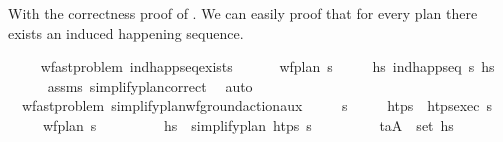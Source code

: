 \begin{isabellebody}
{\isafoldproof}%
%
\isadelimproof
%
\endisadelimproof
%
\begin{isamarkuptext}%
With the correctness proof of . 
  We can easily proof that for every plan there exists an induced happening sequence.%
\end{isamarkuptext}\isamarkuptrue%
\ \ \isamarkupfalse%
\ {\isacharparenleft}{\kern0pt}\ wf{\isacharunderscore}{\kern0pt}ast{\isacharunderscore}{\kern0pt}problem{\isacharparenright}{\kern0pt}\ ind{\isacharunderscore}{\kern0pt}happ{\isacharunderscore}{\kern0pt}seq{\isacharunderscore}{\kern0pt}exists{\isacharcolon}{\kern0pt}\ \isanewline
\ \ \ \ \ {\isachardoublequoteopen}wf{\isacharunderscore}{\kern0pt}plan\ {\isasympi}s{\isachardoublequoteclose}\isanewline
\ \ \ \ \ {\isachardoublequoteopen}{\isasymexists}hs{\isachardot}{\kern0pt}\ ind{\isacharunderscore}{\kern0pt}happ{\isacharunderscore}{\kern0pt}seq\ {\isasympi}s\ hs{\isachardoublequoteclose}\isanewline
%
\isadelimproof
\ \ \ \ %
\endisadelimproof
%
\isatagproof
{}\isamarkupfalse%
\ assms\ simplify{\isacharunderscore}{\kern0pt}plan{\isacharunderscore}{\kern0pt}correct\ \isamarkupfalse%
\ auto%
\endisatagproof
{\isafoldproof}%
%
\isadelimproof
\isanewline
%
\endisadelimproof
\isanewline
\ \ \isamarkupfalse%
\ {\isacharparenleft}{\kern0pt}\ wf{\isacharunderscore}{\kern0pt}ast{\isacharunderscore}{\kern0pt}problem{\isacharparenright}{\kern0pt}\ simplify{\isacharunderscore}{\kern0pt}plan{\isacharunderscore}{\kern0pt}wf{\isacharunderscore}{\kern0pt}ground{\isacharunderscore}{\kern0pt}action{\isacharunderscore}{\kern0pt}aux{\isacharcolon}{\kern0pt}\isanewline
\ \ \ \ \ {\isasympi}s\isanewline
\ \ \ \ \ {\isachardoublequoteopen}htps\ {\isasymequiv}\ htps{\isacharunderscore}{\kern0pt}exec\ {\isasympi}s{\isachardoublequoteclose}\isanewline
\ \ \ \ \ {\isachardoublequoteopen}wf{\isacharunderscore}{\kern0pt}plan\ {\isasympi}s{\isachardoublequoteclose}\isanewline
\ \ \ \ \ \ \ \ \ {\isachardoublequoteopen}hs\ {\isacharequal}{\kern0pt}\ simplify{\isacharunderscore}{\kern0pt}plan\ htps\ {\isasympi}s{\isachardoublequoteclose}\isanewline
\ \ \ \ \ \ \ \ \ {\isachardoublequoteopen}{\isacharparenleft}{\kern0pt}t\isactrlsub a{\isacharcomma}{\kern0pt}A{\isacharparenright}{\kern0pt}\ {\isasymin}\ set\ hs{\isachardoublequoteclose}\isanewline

\end{isabellebody}
